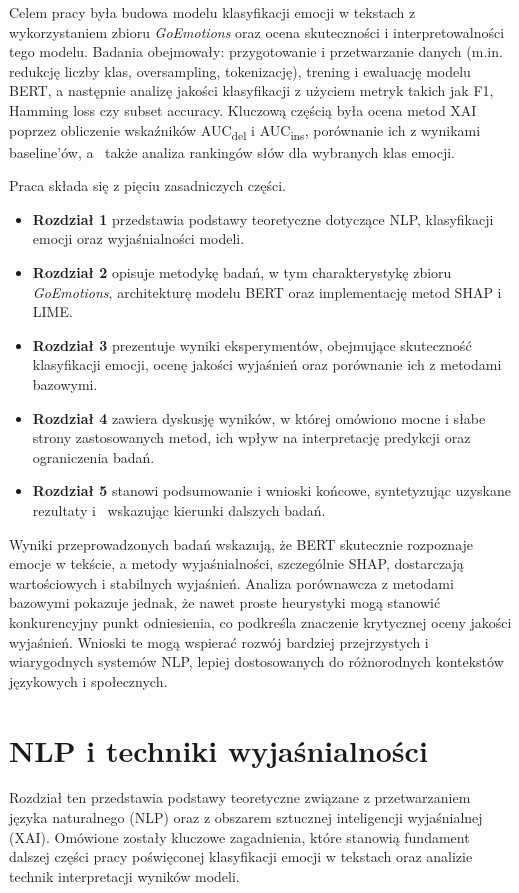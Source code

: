 \documentclass[wmii, inf, mgr]{uwmthesis}
\begin{document}
Celem pracy była budowa modelu klasyfikacji emocji w tekstach z wykorzystaniem zbioru \textit{GoEmotions} oraz ocena skuteczności i interpretowalności tego modelu. Badania obejmowały: przygotowanie i przetwarzanie danych (m.in. redukcję liczby klas, oversampling, tokenizację), trening i ewaluację modelu BERT, a następnie analizę jakości klasyfikacji z użyciem metryk takich jak F1, Hamming loss czy subset accuracy. Kluczową częścią była ocena metod XAI poprzez obliczenie wskaźników AUC\textsubscript{del} i AUC\textsubscript{ins}, porównanie ich z wynikami baseline’ów, a~ także analiza rankingów słów dla wybranych klas emocji. 

Praca składa się z pięciu zasadniczych części. 
\begin{itemize}
	\item \textbf{Rozdział 1} przedstawia podstawy teoretyczne dotyczące NLP, klasyfikacji emocji oraz wyjaśnialności modeli. 
	\item \textbf{Rozdział 2} opisuje metodykę badań, w tym charakterystykę zbioru \textit{GoEmotions}, architekturę modelu BERT oraz implementację metod SHAP i LIME. 
	\item \textbf{Rozdział 3} prezentuje wyniki eksperymentów, obejmujące skuteczność klasyfikacji emocji, ocenę jakości wyjaśnień oraz porównanie ich z metodami bazowymi. 
	\item \textbf{Rozdział 4} zawiera dyskusję wyników, w której omówiono mocne i słabe strony zastosowanych metod, ich wpływ na interpretację predykcji oraz ograniczenia badań. 
	\item \textbf{Rozdział 5} stanowi podsumowanie i wnioski końcowe, syntetyzując uzyskane rezultaty i~ wskazując kierunki dalszych badań. 
\end{itemize}

Wyniki przeprowadzonych badań wskazują, że BERT skutecznie rozpoznaje emocje w tekście, a metody wyjaśnialności, szczególnie SHAP, dostarczają wartościowych i stabilnych wyjaśnień. Analiza porównawcza z metodami bazowymi pokazuje jednak, że nawet proste heurystyki mogą stanowić konkurencyjny punkt odniesienia, co podkreśla znaczenie krytycznej oceny jakości wyjaśnień. Wnioski te mogą wspierać rozwój bardziej przejrzystych i wiarygodnych systemów NLP, lepiej dostosowanych do różnorodnych kontekstów językowych i społecznych.



\chapter{NLP i techniki wyjaśnialności}
Rozdział ten przedstawia podstawy teoretyczne związane z przetwarzaniem języka naturalnego (NLP) oraz z obszarem sztucznej inteligencji wyjaśnialnej (XAI). Omówione zostały kluczowe zagadnienia, które stanowią fundament dalszej części pracy poświęconej klasyfikacji emocji w tekstach oraz analizie technik interpretacji wyników modeli.  
\end{document}
